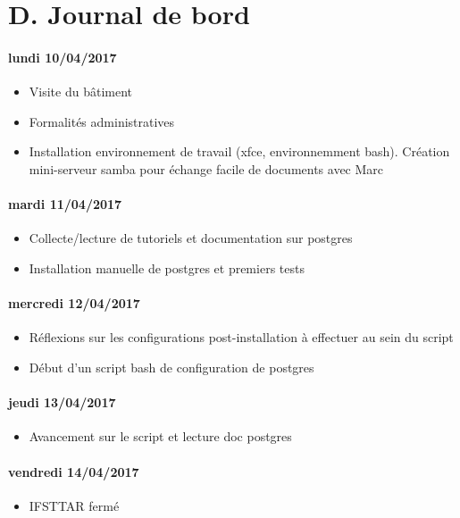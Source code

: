 \section*{D. Journal de bord}

\paragraph{lundi 10/04/2017}
\begin{itemize}
  \item Visite du bâtiment
  \item Formalités administratives
  \item Installation environnement de travail (xfce, environnemment bash). Création mini-serveur samba pour échange facile de documents avec Marc
\end{itemize}

\paragraph{mardi 11/04/2017}
\begin{itemize}
  \item Collecte/lecture de tutoriels et documentation sur postgres
  \item Installation manuelle de postgres et premiers tests
\end{itemize}

\paragraph{mercredi 12/04/2017}
\begin{itemize}
  \item Réflexions sur les configurations post-installation à effectuer au sein du script
  \item Début d'un script bash de configuration de postgres
\end{itemize}

\paragraph{jeudi 13/04/2017}
\begin{itemize}
  \item Avancement sur le script et lecture doc postgres
\end{itemize}

\paragraph{vendredi 14/04/2017}
\begin{itemize}
  \item IFSTTAR fermé
\end{itemize}


